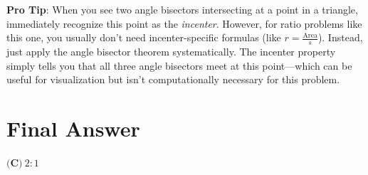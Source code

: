 \documentclass[12pt]{article}
\begin{document}
\vspace{0.3cm}

\begin{tipbox}
\textbf{Pro Tip}: When you see two angle bisectors intersecting at a point in a triangle, immediately recognize this point as the \emph{incenter}. However, for ratio problems like this one, you usually don't need incenter-specific formulas (like $r = \frac{\text{Area}}{s}$). Instead, just apply the angle bisector theorem systematically. The incenter property simply tells you that all three angle bisectors meet at this point—which can be useful for visualization but isn't computationally necessary for this problem.
\end{tipbox}

\section*{Final Answer}

\begin{center}
\Large
$\boxed{\textbf{(C)}\ 2:1}$
\end{center}
\end{document}
